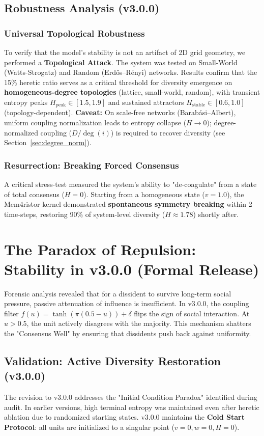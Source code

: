 \documentclass[11pt]{article}
\begin{document}
\subsection{Robustness Analysis (v3.0.0)}

\subsubsection{Universal Topological Robustness}
To verify that the model's stability is not an artifact of 2D grid geometry, we performed a \textbf{Topological Attack}. The system was tested on Small-World (Watts-Strogatz) and Random (Erd\H{o}s--R\'enyi) networks. Results confirm that the 15\% heretic ratio serves as a critical threshold for diversity emergence on \textbf{homogeneous-degree topologies} (lattice, small-world, random), with transient entropy peaks $H_{\text{peak}} \in [1.5, 1.9]$ and sustained attractors $H_{\text{stable}} \in [0.6, 1.0]$ (topology-dependent). \textbf{Caveat:} On scale-free networks (Barab\'asi--Albert), uniform coupling normalization leads to entropy collapse ($H \to 0$); degree-normalized coupling ($D/\deg(i)$) is required to recover diversity (see Section~\ref{sec:degree_norm}).

\subsubsection{Resurrection: Breaking Forced Consensus}
A critical stress-test measured the system's ability to "de-coagulate" from a state of total consensus ($H=0$). Starting from a homogeneous state ($v=1.0$), the Mem4ristor kernel demonstrated \textbf{spontaneous symmetry breaking} within 2 time-steps, restoring 90\% of system-level diversity ($H \approx 1.78$) shortly after.

\section{The Paradox of Repulsion: Stability in v3.0.0 (Formal Release)}
Forensic analysis revealed that for a dissident to survive long-term social pressure,
passive attenuation of influence is insufficient. In v3.0.0, the coupling filter $f(u) = \tanh(\pi(0.5-u)) + \delta$
flips the sign of social interaction. At $u > 0.5$, the unit actively disagrees with the majority.
This mechanism shatters the "Consensus Well" by ensuring that dissidents push back against uniformity.

\subsection{Validation: Active Diversity Restoration (v3.0.0)}
The revision to v3.0.0 addresses the "Initial Condition Paradox" identified during audit. In earlier versions, high terminal entropy was maintained even after heretic ablation due to randomized starting states. v3.0.0 maintains the \textbf{Cold Start Protocol}: all units are initialized to a singular point ($v=0, w=0, H=0$).
\end{document}
